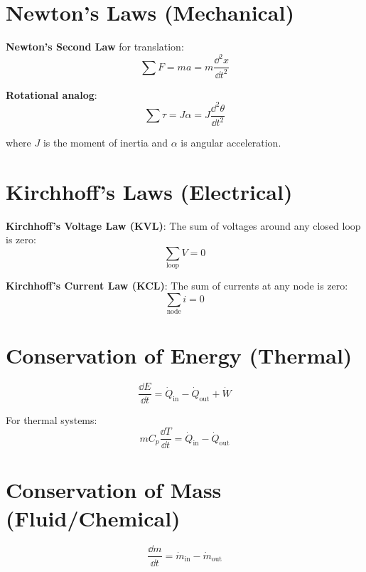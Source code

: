 \section{Newton's Laws (Mechanical)}

\textbf{Newton's Second Law} for translation:
\begin{equation}
\sum F = ma = m\frac{\dd^2 x}{\dd t^2}
\end{equation}

\textbf{Rotational analog}:
\begin{equation}
\sum \tau = J\alpha = J\frac{\dd^2 \theta}{\dd t^2}
\end{equation}

where $J$ is the moment of inertia and $\alpha$ is angular acceleration.

\section{Kirchhoff's Laws (Electrical)}

\textbf{Kirchhoff's Voltage Law (KVL)}: The sum of voltages around any closed loop is zero:
\begin{equation}
\sum_{\text{loop}} V = 0
\end{equation}

\textbf{Kirchhoff's Current Law (KCL)}: The sum of currents at any node is zero:
\begin{equation}
\sum_{\text{node}} i = 0
\end{equation}

\section{Conservation of Energy (Thermal)}

\begin{equation}
\frac{\dd E}{\dd t} = \dot{Q}_{\text{in}} - \dot{Q}_{\text{out}} + \dot{W}
\end{equation}

For thermal systems:
\begin{equation}
mC_p\frac{\dd T}{\dd t} = \dot{Q}_{\text{in}} - \dot{Q}_{\text{out}}
\end{equation}

\section{Conservation of Mass (Fluid/Chemical)}

\begin{equation}
\frac{\dd m}{\dd t} = \dot{m}_{\text{in}} - \dot{m}_{\text{out}}
\end{equation}

